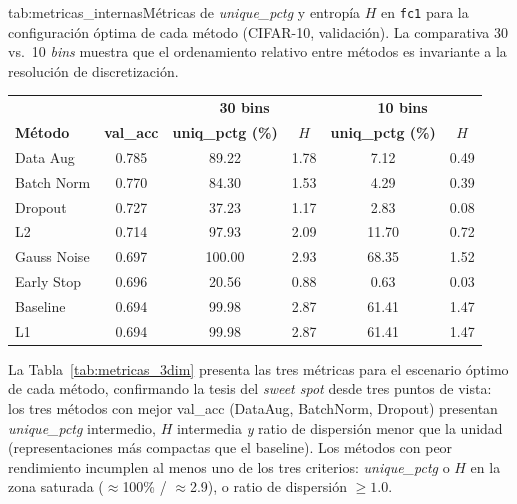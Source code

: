 \begin{table}{tab:metricas_internas}{Métricas de \textit{unique\_pctg} y entropía $H$ en \texttt{fc1}
para la configuración óptima de cada método (CIFAR-10, validación).
La comparativa 30 vs.\ 10 \textit{bins} muestra que el ordenamiento relativo entre
métodos es invariante a la resolución de discretización.}
\small
\begin{tabular}{lc|cc|cc}
\toprule
& & \multicolumn{2}{c|}{\textbf{30 bins}} & \multicolumn{2}{c}{\textbf{10 bins}} \\
\textbf{Método} & \textbf{val\_acc} & \textbf{uniq\_pctg (\%)} & \textbf{$H$}
  & \textbf{uniq\_pctg (\%)} & \textbf{$H$} \\
\midrule
Data Aug    & 0.785 &  89.22 & 1.78 &  7.12 & 0.49 \\
Batch Norm  & 0.770 &  84.30 & 1.53 &  4.29 & 0.39 \\
Dropout     & 0.727 &  37.23 & 1.17 &  2.83 & 0.08 \\
L2          & 0.714 &  97.93 & 2.09 & 11.70 & 0.72 \\
Gauss Noise & 0.697 & 100.00 & 2.93 & 68.35 & 1.52 \\
Early Stop  & 0.696 &  20.56 & 0.88 &  0.63 & 0.03 \\
Baseline    & 0.694 &  99.98 & 2.87 & 61.41 & 1.47 \\
L1          & 0.694 &  99.98 & 2.87 & 61.41 & 1.47 \\
\bottomrule
\end{tabular}
\end{table}

La Tabla~\ref{tab:metricas_3dim} presenta las tres métricas para el
escenario óptimo de cada método, confirmando la tesis del \textit{sweet spot} desde tres
puntos de vista: los tres métodos con mejor val\_acc (DataAug, BatchNorm, Dropout) presentan
\textit{unique\_pctg} intermedio, $H$ intermedia \textit{y} ratio de dispersión menor
que la unidad (representaciones más compactas que el baseline). Los métodos con peor
rendimiento incumplen al menos uno de los tres criterios: \textit{unique\_pctg} o $H$
en la zona saturada ($\approx$100\% / $\approx$2.9), o ratio de dispersión $\geq 1.0$.

